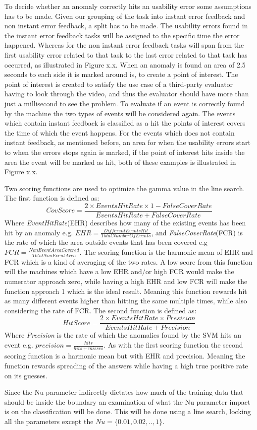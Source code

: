 To decide whether an anomaly correctly hits an usability error some assumptions has to be made. Given our grouping of the task into instant error feedback and non instant error feedback, a split has to be made. The usability errors found in the instant error feedback tasks will be assigned to the specific time the error happened. Whereas for the non instant error feedback tasks will span from the first usability error related to that task to the last error related to that task has occurred, as illustrated in Figure x.x.
When an anomaly is found an area of 2.5 seconds to each side it is marked around is, to create a point of interest. The point of interest is created to satisfy the use case of a third-party evaluator having to look through the video, and thus the evaluator should have more than just a millisecond to see the problem.
To evaluate if an event is correctly found by the machine the two types of events will be considered again.
The events which contain instant feedback is classified as a hit the points of interest covers the time of which the event happens.
For the events which does not contain instant feedback, as mentioned before, an area for when the usability errors start to when the errors stops again is marked, if the point of interest hits inside the area the event will be marked as hit, both of these examples is illustrated in Figure x.x. 

Two scoring functions are used to optimize the gamma value in the line search. The first function is defined as: 
\[CovScore = \frac{2 \times EventsHitRate \times 1-FalseCoverRate}{EventsHitRate + FalseCoverRate}\]
Where \textit{EventHitRate}(EHR) describes how many of the existing events has been hit by an anomaly e.g. $EHR = \frac{DifferentEventsHit}{TotalNumberOfEvents}$, and \textit{FalseCoverRate}(FCR) is the rate of which the area outside events that has been covered e.g $FCR = \frac{NonEventAreaCovered}{TotalNonEventArea}$. 
The scoring function is the harmonic mean of EHR and FCR which is a kind of averaging of the two rates.
A low score from this function will the machines which have a low EHR and/or high FCR would make the numerator approach zero, while having a high EHR and low FCR will make the function approach 1 which is the ideal result.
Meaning this function rewards hit as many different events higher than hitting the same multiple times, while also considering the rate of FCR.
The second function is defined as: 
\[HitScore = \frac{2 \times EventsHitRate \times Presicion}{EventsHitRate + Precision}\]
Where \textit{Precision} is the rate of which the anomalies found by the SVM hits an event e.g. $precision = \frac{hits}{hits+misses}$. 
As with the first scoring function the second scoring function is a harmonic mean but with EHR and precision.
Meaning the function rewards spreading of the answers while having a high true positive rate on its guesses.

Since the Nu parameter indirectly dictates how much of the training data that should be inside the boundary an examination of what the Nu parameter impact is on the classification will be done.
This will be done using a line search, locking all the parameters except the $Nu = \{0.01, 0.02,.., 1\}$. 
